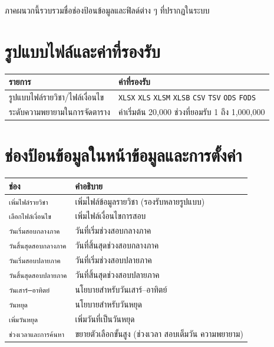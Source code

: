 \appendix
{}

\noindent ภาคผนวกนี้รวบรวมชื่อช่องป้อนข้อมูลและฟิลด์ต่าง ๆ ที่ปรากฏในระบบ

\section{รูปแบบไฟล์และค่าที่รองรับ}

\small
\begin{longtable}{L{6cm}L{8.5cm}}
\toprule
\textbf{รายการ} & \textbf{ค่าที่รองรับ} \\
\midrule
รูปแบบไฟล์รายวิชา/ไฟล์เงื่อนไข & \texttt{XLSX} \texttt{XLS} \texttt{XLSM} \texttt{XLSB}
  \texttt{CSV} \texttt{TSV} \texttt{ODS} \texttt{FODS} \\
ระดับความพยายามในการจัดตาราง & ค่าเริ่มต้น 20{,}000 ช่วงที่ยอมรับ 1 ถึง 1{,}000{,}000 \\
\bottomrule
\end{longtable}

\section{ช่องป้อนข้อมูลในหน้าข้อมูลและการตั้งค่า}

\small
\begin{longtable}{L{5cm}L{9.5cm}}
\toprule
\textbf{ช่อง} & \textbf{คำอธิบาย} \\
\midrule
\texttt{เพิ่มไฟล์รายวิชา} & เพิ่มไฟล์ข้อมูลรายวิชา (รองรับหลายรูปแบบ) \\
\texttt{เลือกไฟล์เงื่อนไข} & เพิ่มไฟล์เงื่อนไขการสอบ \\
\texttt{วันเริ่มสอบกลางภาค} & วันที่เริ่มช่วงสอบกลางภาค \\
\texttt{วันสิ้นสุดสอบกลางภาค} & วันที่สิ้นสุดช่วงสอบกลางภาค \\
\texttt{วันเริ่มสอบปลายภาค} & วันที่เริ่มช่วงสอบปลายภาค \\
\texttt{วันสิ้นสุดสอบปลายภาค} & วันที่สิ้นสุดช่วงสอบปลายภาค \\
\texttt{วันเสาร์–อาทิตย์} & นโยบายสำหรับวันเสาร์–อาทิตย์ \\
\texttt{วันหยุด} & นโยบายสำหรับวันหยุด \\
\texttt{เพิ่มวันหยุด} & เพิ่มวันที่เป็นวันหยุด \\
\texttt{ช่วงเวลาและการค้นหา} & ขยายตัวเลือกขั้นสูง (ช่วงเวลา สอบเต็มวัน ความพยายาม) \\
\bottomrule
\end{longtable}

